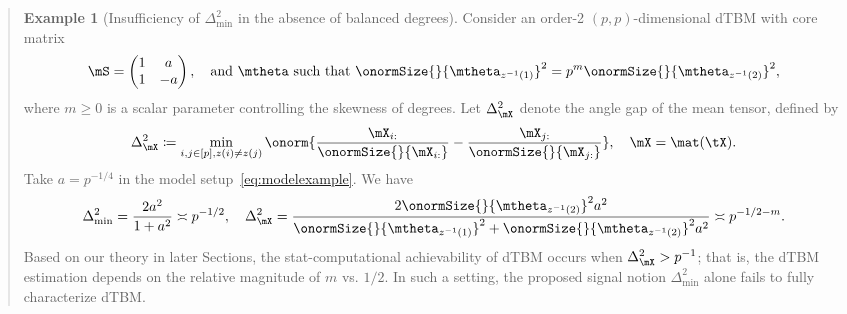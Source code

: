 \documentclass[11pt]{article}
\theoremstyle{definition}
\theoremstyle{definition}
\newtheorem{example}{Example}
\begin{document}
\begin{enumerate}[wide, labelwidth=!, labelindent=0pt]
\begin{enumerate}
\begin{quote}
\begin{example}[Insufficiency of $\Delta_{\min}^2$ in the absence of balanced degrees] Consider an order-2 $(p,p)$-dimensional dTBM with core matrix
\begin{equation}\label{eq:modelexample}
    \mS = \begin{pmatrix} 1 &a\\
    1 & -a
    \end{pmatrix}, \quad \text{and} \ \mtheta \text{ such that } \onormSize{}{\mtheta_{z^{-1}(1)}}^2 = p^m \onormSize{}{\mtheta_{z^{-1}(2)}}^2,
\end{equation}
where $m\geq 0$ is a scalar parameter controlling the skewness of degrees. Let $\Delta_{\mX}^2$ denote the angle gap of the mean tensor, defined by
\begin{equation}\label{eq:delta_x}
    \Delta_{\mX}^2 \coloneqq \min_{i,j \in [p], z(i) \neq z(j)} \onorm{ \frac{\mX_{i:}}{\onormSize{}{\mX_{i:}}}  -  \frac{\mX_{j:}}{\onormSize{}{\mX_{j:}}}  }, \quad \mX = \mat(\tX). %
\end{equation}
Take $ a = p^{-1/4}$ in the model setup~\eqref{eq:modelexample}. We have 
\begin{equation}
    \Delta_{\min}^2 = \frac{2 a^2}{1 + a^2} \asymp p^{-1/2}, \quad  \Delta_{\mX}^2 = \frac{2\onormSize{}{\mtheta_{z^{-1}(2)}}^{2} a^2}{\onormSize{}{\mtheta_{z^{-1}(1)}}^{2} +  \onormSize{}{\mtheta_{z^{-1}(2)}}^{2}a^2} \asymp p^{-1/2-m}.
\end{equation}
Based on our theory in later Sections, the stat-computational achievability of dTBM occurs when $\Delta^2_{\mX}>p^{-1}$; that is, the dTBM estimation depends on the relative magnitude of $m$ vs. $1/2$. In such a setting, the proposed signal notion $\Delta^2_{\min}$ alone fails to fully characterize dTBM. %
\end{example}


\end{quote}
\end{enumerate}
\end{enumerate}
\end{document}
